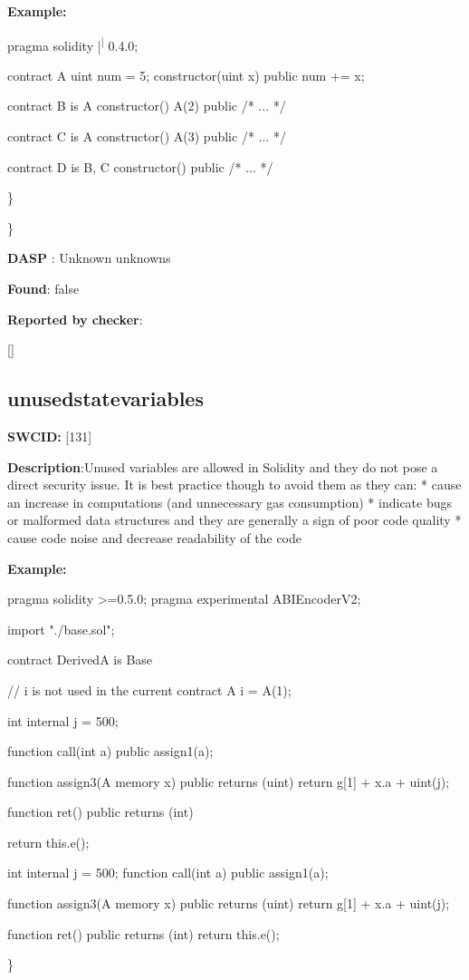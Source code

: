\documentclass{article}
\begin{document}
\textbf{Example:} 
\begin{ffcode} 

pragma solidity |\textsuperscript| 0.4.0;

contract A{
    uint num = 5;
    constructor(uint x) public{
        num += x;
    }
}

contract B is A{
    constructor() A(2) public { /* ... */ }
}

contract C is A {
    constructor() A(3) public { /* ... */ }
}

contract D is B, C {
    constructor() public { /* ... */ }
}

\end{ffcode} 
\} 

\} 

\textbf{DASP} : Unknown unknowns

\textbf{Found}: false

\textbf{Reported by checker}: 
\begin{ffcode} 

[]
\end{ffcode} 
\subsection{unused{\textunderscore}state{\textunderscore}variables} 
\textbf{SWC{\textunderscore}ID:} [131]

\textbf{Description}:Unused variables are allowed in Solidity and they do not pose a direct security issue. It is best practice though to avoid them as they can:
* cause an increase in computations (and unnecessary gas consumption)
* indicate bugs or malformed data structures and they are generally a sign of poor code quality
* cause code noise and decrease readability of the code


\textbf{Example:} 
\begin{ffcode} 

pragma solidity >=0.5.0;
pragma experimental ABIEncoderV2;

import "./base.sol";

contract DerivedA is Base {
    // i is not used in the current contract
    A i = A(1);

    int internal j = 500;

    function call(int a) public {
        assign1(a);
    }

    function assign3(A memory x) public returns (uint) {
        return g[1] + x.a + uint(j);
    }

    function ret() public returns (int){
        return this.e();

    }
  int internal j = 500;
function call(int a) public {
        assign1(a);
    }

    function assign3(A memory x) public returns (uint) {
        return g[1] + x.a + uint(j);
    }

    function ret() public returns (int){
        return this.e();
  }
}

\end{ffcode} 
\} 
\end{document}

